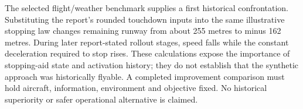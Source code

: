 \documentclass[11pt,a4paper]{article}
\begin{document}
The selected flight/weather benchmark supplies a first historical confrontation. Substituting the report's rounded touchdown inputs into the same illustrative stopping law changes remaining runway from about 255 metres to minus 162 metres. During later report-stated rollout stages, speed falls while the constant deceleration required to stop rises. These calculations expose the importance of stopping-aid state and activation history; they do not establish that the synthetic approach was historically flyable. A completed improvement comparison must hold aircraft, information, environment and objective fixed. No historical superiority or safer operational alternative is claimed.

\clearpage
\tableofcontents
\clearpage

\clearpage

\clearpage

\end{document}
